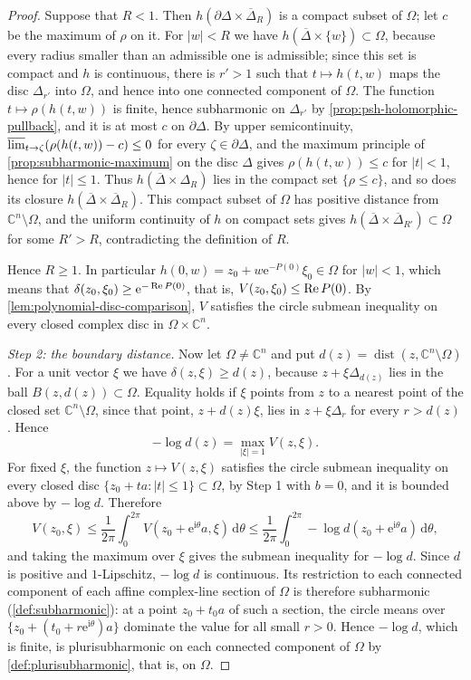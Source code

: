 \begin{proof}
Suppose that $R<1$. Then $h(\partial\Delta\times\overline\Delta_R)$ is a compact subset of $\Omega$; let $c$ be the maximum of $\rho$ on it. For $|w|<R$ we have $h(\overline\Delta\times\{w\})\subset\Omega$, because every radius smaller than an admissible one is admissible; since this set is compact and $h$ is continuous, there is $r'>1$ such that $t\mapsto h(t,w)$ maps the disc $\Delta_{r'}$ into $\Omega$, and hence into one connected component of $\Omega$. The function $t\mapsto\rho(h(t,w))$ is finite, hence subharmonic on $\Delta_{r'}$ by \cref{prop:psh-holomorphic-pullback}, and it is at most $c$ on $\partial\Delta$. By upper semicontinuity, $\varlimsup_{t\to\zeta}(\rho(h(t,w))-c)\le0$ for every $\zeta\in\partial\Delta$, and the maximum principle of \cref{prop:subharmonic-maximum} on the disc $\Delta$ gives $\rho(h(t,w))\le c$ for $|t|<1$, hence for $|t|\le1$. Thus $h(\overline\Delta\times\Delta_R)$ lies in the compact set $\{\rho\le c\}$, and so does its closure $h(\overline\Delta\times\overline\Delta_R)$. This compact subset of $\Omega$ has positive distance from $\mathbb C^n\setminus\Omega$, and the uniform continuity of $h$ on compact sets gives $h(\overline\Delta\times\overline\Delta_{R'})\subset\Omega$ for some $R'>R$, contradicting the definition of $R$.

Hence $R\ge1$. In particular $h(0,w)=z_0+w\mathrm e^{-P(0)}\xi_0\in\Omega$ for $|w|<1$, which means that $\delta(z_0,\xi_0)\ge\mathrm e^{-\operatorname{Re} P(0)}$, that is, $V(z_0,\xi_0)\le\operatorname{Re} P(0)$. By \cref{lem:polynomial-disc-comparison}, $V$ satisfies the circle submean inequality on every closed complex disc in $\Omega\times\mathbb C^n$.

\emph{Step 2: the boundary distance.} Now let $\Omega\ne\mathbb C^n$ and put $d(z)=\operatorname{dist}(z,\mathbb C^n\setminus\Omega)$. For a unit vector $\xi$ we have $\delta(z,\xi)\ge d(z)$, because $z+\xi\Delta_{d(z)}$ lies in the ball $B(z,d(z))\subset\Omega$. Equality holds if $\xi$ points from $z$ to a nearest point of the closed set $\mathbb C^n\setminus\Omega$, since that point, $z+d(z)\xi$, lies in $z+\xi\Delta_r$ for every $r>d(z)$. Hence
\[
 -\log d(z)=\max_{|\xi|=1}V(z,\xi).
\]
For fixed $\xi$, the function $z\mapsto V(z,\xi)$ satisfies the circle submean inequality on every closed disc $\{z_0+ta:|t|\le1\}\subset\Omega$, by Step 1 with $b=0$, and it is bounded above by $-\log d$. Therefore
\[
 V(z_0,\xi)\le\frac1{2\pi}\int_0^{2\pi}V(z_0+\mathrm e^{\mathrm i\theta}a,\xi)\,\mathrm d\theta\le\frac1{2\pi}\int_0^{2\pi}-\log d(z_0+\mathrm e^{\mathrm i\theta}a)\,\mathrm d\theta,
\]
and taking the maximum over $\xi$ gives the submean inequality for $-\log d$. Since $d$ is positive and $1$-Lipschitz, $-\log d$ is continuous. Its restriction to each connected component of each affine complex-line section of $\Omega$ is therefore subharmonic (\cref{def:subharmonic}): at a point $z_0+t_0a$ of such a section, the circle means over $\{z_0+(t_0+r\mathrm e^{\mathrm i\theta})a\}$ dominate the value for all small $r>0$. Hence $-\log d$, which is finite, is plurisubharmonic on each connected component of $\Omega$ by \cref{def:plurisubharmonic}, that is, on $\Omega$.


\end{proof}
